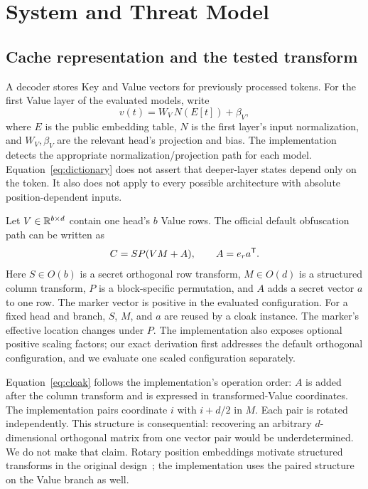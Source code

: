 \section{System and Threat Model}
\label{sec:model}
\subsection{Cache representation and the tested transform}
A decoder stores Key and Value vectors for previously processed tokens. For the first Value layer of the evaluated models, write
\begin{equation}
 v(t)=W_V\,N(E[t])+\beta_V,
 \label{eq:dictionary}
\end{equation}
where $E$ is the public embedding table, $N$ is the first layer's input normalization, and $W_V,\beta_V$ are the relevant head's projection and bias. The implementation detects the appropriate normalization/projection path for each model. Equation~\eqref{eq:dictionary} does not assert that deeper-layer states depend only on the token. It also does not apply to every possible architecture with absolute position-dependent inputs.

Let $V\in\mathbb{R}^{b\times d}$ contain one head's $b$ Value rows. The official default obfuscation path can be written as
\begin{equation}
 C=S P(VM+A),\qquad A=e_r a^{\mathsf{T}}.
 \label{eq:cloak}
\end{equation}
Here $S\in O(b)$ is a secret orthogonal row transform, $M\in O(d)$ is a structured column transform, $P$ is a block-specific permutation, and $A$ adds a secret vector $a$ to one row. The marker vector is positive in the evaluated configuration. For a fixed head and branch, $S$, $M$, and $a$ are reused by a cloak instance. The marker's effective location changes under $P$. The implementation also exposes optional positive scaling factors; our exact derivation first addresses the default orthogonal configuration, and we evaluate one scaled configuration separately.

Equation~\eqref{eq:cloak} follows the implementation's operation order: $A$ is added after the column transform and is expressed in transformed-Value coordinates. The implementation pairs coordinate $i$ with $i+d/2$ in $M$. Each pair is rotated independently. This structure is consequential: recovering an arbitrary $d$-dimensional orthogonal matrix from one vector pair would be underdetermined. We do not make that claim. Rotary position embeddings motivate structured transforms in the original design~\cite{kvcloak,rope}; the implementation uses the paired structure on the Value branch as well.

